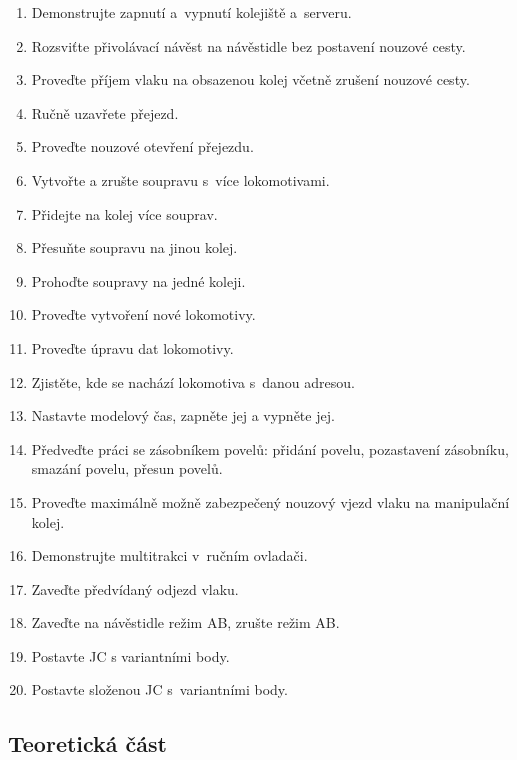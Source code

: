 \documentclass[12pt,a4paper]{article}
\begin{document}
\begin{enumerate}[leftmargin=*]
\item Demonstrujte zapnutí a~vypnutí kolejiště a~serveru.
\item Rozsviťte přivolávací návěst na návěstidle bez postavení nouzové cesty.
\item Proveďte příjem vlaku na obsazenou kolej včetně zrušení nouzové cesty.
\item Ručně uzavřete přejezd.
\item Proveďte nouzové otevření přejezdu.
\item Vytvořte a zrušte soupravu s~více lokomotivami.
\item Přidejte na kolej více souprav.
\item Přesuňte soupravu na jinou kolej.
\item Prohoďte soupravy na jedné koleji.
\item Proveďte vytvoření nové lokomotivy.
\item Proveďte úpravu dat lokomotivy.
\item Zjistěte, kde se nachází lokomotiva s~danou adresou.
\item Nastavte modelový čas, zapněte jej a vypněte jej.
\item Předveďte práci se zásobníkem povelů: přidání povelu, pozastavení
zásobníku, smazání povelu, přesun povelů.
\item Proveďte maximálně možně zabezpečený nouzový vjezd vlaku na manipulační
kolej.
\item Demonstrujte multitrakci v~ručním ovladači.
\item Zaveďte předvídaný odjezd vlaku.
\item Zaveďte na návěstidle režim AB, zrušte režim AB.
\item Postavte JC s variantními body.
\item Postavte složenou JC s~variantními body.
\end{enumerate}

\newpage
\subsection{Teoretická část}
\end{document}
